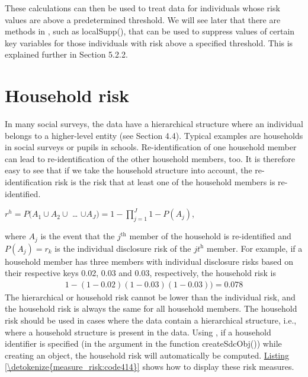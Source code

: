 \documentclass[letterpaper,10pt,english]{sphinxmanual}
\begin{document}
These calculations can then be used to treat data for individuals whose
risk values are above a predetermined threshold. We will see later that
there are methods in , such as localSupp(), that can be used
to suppress values of certain key variables for those individuals with
risk above a specified threshold. This is explained further in Section
5.2.2.


\section{Household risk}
\label{\detokenize{measure_risk:household-risk}}
In many social surveys, the data have a hierarchical structure where an
individual belongs to a higher-level entity (see Section 4.4). Typical
examples are households in social surveys or pupils in schools.
Re-identification of one household member can lead to re-identification
of the other household members, too. It is therefore easy to see that if
we take the household structure into account, the re-identification risk
is the risk that at least one of the household members is re-identified.

\(r^{h} = P(A_{1} \cup A_{2} \cup\) …
\(\cup A_{J}) = 1 - \prod_{j = 1}^{J}{1 - P(A_{j})}\),

where \(A_{j}\) is the event that the \(j\)$^{\text{th}}$ member of
the household is re-identified and \(P\left( A_{j} \right) = r_{k}\)
is the individual disclosure risk of the \(jt\)$^{\text{h}}$ member.
For example, if a household member has three members with individual
disclosure risks based on their respective keys 0.02, 0.03 and 0.03,
respectively, the household risk is
\begin{equation*}
\begin{split}1 - (1 - 0.02)(1 - 0.03)(1 - 0.03)) = 0.078\end{split}
\end{equation*}
The hierarchical or household risk cannot be lower than the individual
risk, and the household risk is always the same for all household
members. The household risk should be used in cases where the data
contain a hierarchical structure, i.e., where a household structure is
present in the data. Using , if a household identifier is
specified (in the argument  in the function createSdcObj()) while
creating an  object, the household risk will automatically be
computed. \hyperref[\detokenize{measure_risk:code414}]{Listing \ref{\detokenize{measure_risk:code414}}} shows how to display these risk measures.
\end{document}
